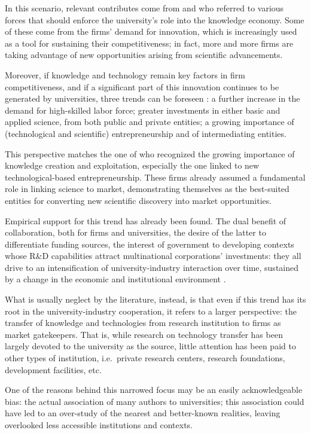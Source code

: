 In this scenario, relevant contributes come from \citet{OShea2004} and \citet{Yusuf2008} who referred to various forces that should enforce the university's role into the knowledge economy. Some of these come from the firms' demand for innovation, which is increasingly used as a tool for sustaining their competitiveness; in fact, more and more firms are taking advantage of new opportunities arising from scientific advancements. 

Moreover, if knowledge and technology remain key factors in firm competitiveness, and if a significant part of this innovation continues to be generated by universities, three trends can be foreseen \citep{Yusuf2008}: a further increase in the demand for high-skilled labor force; greater investments in either basic and applied science, from both public and private entities; a growing importance of (technological and scientific) entrepreneurship and of intermediating entities. 

This perspective matches the one of \citet{OShea2004} who recognized the growing importance of knowledge creation and exploitation, especially the one linked to new technological-based entrepreneurship. These firms already assumed a fundamental role in linking science to market, demonstrating themselves as the best-suited entities for converting new scientific discovery into market opportunities. 

Empirical support for this trend has already been found. The dual benefit of collaboration, both for firms and universities, the desire of the latter to differentiate funding sources, the interest of government to developing contexts whose R\&D capabilities attract multinational corporations' investments: they all drive to an intensification of university-industry interaction over time, sustained by a change in the economic and institutional environment \citep{Debackere2005}.

What is usually neglect by the literature, instead, is that even if this trend has its root in the university-industry cooperation, it refers to a larger perspective: the transfer of knowledge and technologies from research institution to firms as market gatekeepers. That is, while research on technology transfer has been largely devoted to the university as the source, little attention has been paid to other types of institution, i.e.\ private research centers, research foundations, development facilities, etc.

One of the reasons behind this narrowed focus may be an easily acknowledgeable bias: the actual association of many authors to universities; this association could have led to an over-study of the nearest and better-known realities, leaving overlooked less accessible institutions and contexts.

